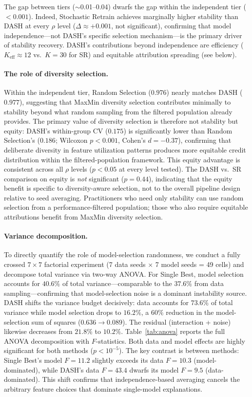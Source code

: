 \documentclass[11pt]{article}
\newcommand{\dash}{\textsc{DASH}}
\newcommand{\rhovar}{\rho}
\begin{document}
The gap between tiers ($\sim$0.01--0.04) dwarfs the gap within the
independent tier ($< 0.001$). Indeed, Stochastic Retrain achieves
marginally higher stability than \dash{} at every $\rhovar$ level
($\Delta \approx +0.001$, not significant), confirming that model
independence---not \dash{}'s specific selection mechanism---is the
primary driver of stability recovery. \dash{}'s contributions beyond
independence are efficiency ($K_{\text{eff}} \approx 12$ vs.\ $K = 30$
for SR) and equitable attribution spreading (see below).

\paragraph{The role of diversity selection.}
Within the independent tier, Random Selection ($0.976$) nearly matches
\dash{} ($0.977$), suggesting that MaxMin diversity selection contributes
minimally to stability beyond what random sampling from the filtered
population already provides. The primary value of diversity selection
is therefore not stability but equity: \dash{}'s within-group CV
($0.175$) is significantly lower than Random Selection's ($0.186$;
Wilcoxon $p < 0.001$, Cohen's $d = -0.37$), confirming that deliberate
diversity in feature utilization patterns produces more equitable credit
distribution within the filtered-population framework. This equity
advantage is consistent across all $\rhovar$ levels ($p < 0.05$ at
every level tested). The \dash{} vs.\ SR comparison on equity is
\emph{not} significant ($p = 0.44$), indicating that the equity benefit
is specific to diversity-aware selection, not to the overall pipeline
design relative to seed averaging. Practitioners who need only stability
can use random selection from a performance-filtered population;
those who also require equitable attributions benefit from MaxMin
diversity selection.

\paragraph{Variance decomposition.}
To directly quantify the role of model-selection randomness, we conduct
a fully crossed $7 \times 7$ factorial experiment (7 data seeds $\times$
7 model seeds = 49 cells) and decompose total variance via two-way
ANOVA. For Single Best, model selection accounts for $40.6\%$ of total
variance---comparable to the $37.6\%$ from data sampling---confirming
that model-selection noise is a dominant instability source. \dash{}
shifts the variance budget decisively: data accounts for $73.6\%$ of
total variance while model selection drops to $16.2\%$, a $60\%$
reduction in the model-selection sum of squares ($0.636 \to 0.089$).
The residual (interaction + noise) likewise decreases from $21.8\%$ to
$10.2\%$. Table~\ref{tab:anova} reports the full ANOVA decomposition
with $F$-statistics. Both data and model effects are highly significant
for both methods ($p < 10^{-5}$). The key contrast is between methods:
Single Best's model $F = 11.2$ slightly exceeds its data $F = 10.3$
(model-dominated), while \dash{}'s data $F = 43.4$ dwarfs its model
$F = 9.5$ (data-dominated). This shift confirms that
independence-based averaging cancels the arbitrary feature choices that
dominate single-model explanations.
\end{document}
